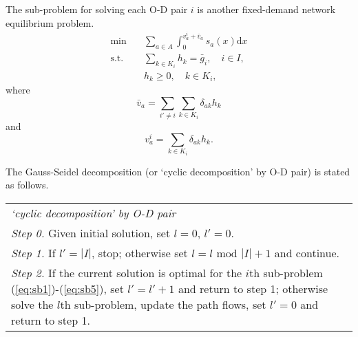 The sub-problem for solving each O-D pair $i$ is another fixed-demand network equilibrium problem.
\begin{align} \label{eq:sb1}
    \min & \quad \sum_{a \in A} \int_0^{v_a^i + \bar{v}_a} s_a(x) \mathrm{d} x \\
    \text{s.t.} &\quad \sum_{k \in K_i} h_k = \bar{g}_i, \quad i \in I, \\
    & \quad h_k \geq 0, \quad k \in K_i,
\end{align}
where 
\begin{equation}
    \bar{v}_a = \sum_{i' \neq i} \sum_{k \in K_i} \delta_{ak} h_k
\end{equation}
and
\begin{equation} \label{eq:sb5}
    v_a^i = \sum_{k \in K_i} \delta_{ak} h_k.
\end{equation}

The Gauss-Seidel decomposition (or `cyclic decomposition' by O-D pair) is stated as follows.

\begin{table}[H]
    \begin{tabular}{ m{} }
        \hspace{-.5cm}\emph{`cyclic decomposition' by O-D pair} \\
        \emph{Step 0.} Given initial solution, set $l = 0$, $l' = 0$.\\
        \emph{Step 1.} If $l' = |I|$, stop; otherwise set $l = l \text{ mod } |I| + 1$ and continue.\\
        \emph{Step 2.} If the current solution is optimal for the $i$th sub-problem (\ref{eq:sb1})-(\ref{eq:sb5}), set $l' = l' + 1$ and return to step 1; otherwise solve the $l$th sub-problem, update the path flows, set $l' = 0$ and return to step 1.\\
    \end{tabular}
\end{table}

